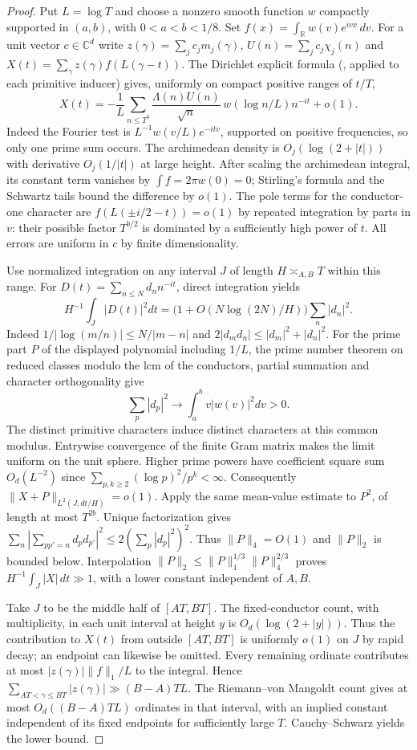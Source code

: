 \documentclass[11pt]{article}
\begin{document}
\begin{proof}
Put $L=\log T$ and choose a nonzero smooth function $w$ compactly supported
in $(a,b)$, with $0<a<b<1/8$. Set
$f(x)=\int_{\mathbb R}w(v)e^{ivx}\,dv$. For a unit vector $c\in\mathbb C^d$
write $z(\gamma)=\sum_j c_jm_j(\gamma)$, $U(n)=\sum_jc_j\chi_j(n)$ and
$X(t)=\sum_\gamma z(\gamma)f(L(\gamma-t))$.
The Dirichlet explicit formula
(\cite[Lemma 2.1]{liuye}, applied to each primitive inducer) gives, uniformly
on compact positive ranges of $t/T$,
\[
 X(t)=-\frac1L\sum_{n\le T^b}\frac{\Lambda(n)U(n)}{\sqrt n}\,
             w(\log n/L)n^{-it}+o(1).
\]
Indeed the Fourier test is $L^{-1}w(v/L)e^{-itv}$, supported on positive
frequencies, so only one prime sum occurs. The archimedean density is
$O_j(\log(2+|t|))$ with derivative $O_j(1/|t|)$ at large height.
After scaling the archimedean integral, its constant term vanishes by
$\int f=2\pi w(0)=0$; Stirling's formula and the Schwartz tails bound
the difference by $o(1)$. The pole terms for the conductor-one character
are $f(L(\pm i/2-t))=o(1)$ by repeated integration by parts in $v$:
their possible factor $T^{b/2}$ is dominated by a sufficiently high
power of $t$. All errors are uniform in $c$ by finite dimensionality.

Use normalized integration on any interval $J$ of length $H\asymp_{A,B}T$
within this range. For $D(t)=\sum_{n\le N}d_n n^{-it}$, direct integration yields
\[
 H^{-1}\int_J|D(t)|^2dt=
 \bigl(1+O(N\log(2N)/H)\bigr)\sum_n|d_n|^2 .
\]
Indeed $1/|\log(m/n)|\le N/|m-n|$ and
$2|d_m d_n|\le |d_m|^2+|d_n|^2$.
For the prime part $P$ of the displayed polynomial including $1/L$,
the prime number theorem on reduced classes modulo the lcm of the
conductors, partial summation and character orthogonality give
\[
 \sum_p |d_p|^2\longrightarrow
       \int_a^b v|w(v)|^2dv>0 .
\]
The distinct primitive characters induce distinct characters at this common
modulus. Entrywise convergence of the finite Gram matrix makes the limit
uniform on the unit sphere. Higher prime powers have coefficient square sum
$O_d(L^{-2})$ since $\sum_{p,k\ge2}(\log p)^2/p^k<\infty$.
Consequently $\|X+P\|_{L^2(J,dt/H)}=o(1)$.
Apply the same mean-value estimate to $P^2$, of length at most $T^{2b}$.
Unique factorization gives
$\sum_n|\sum_{p p'=n} d_pd_{p'}|^2\le2(\sum_p|d_p|^2)^2$.
Thus $\|P\|_4=O(1)$ and $\|P\|_2$ is bounded below.
Interpolation $\|P\|_2\le\|P\|_1^{1/3}\|P\|_4^{2/3}$ proves
$H^{-1}\int_J|X|\,dt\gg 1$, with a lower constant independent of $A,B$.

Take $J$ to be the middle half of $[AT,BT]$. The fixed-conductor count,
with multiplicity, in each unit interval at height $y$ is
$O_d(\log(2+|y|))$. Thus the contribution to $X(t)$ from outside
$[AT,BT]$ is uniformly $o(1)$ on $J$ by rapid decay; an endpoint
can likewise be omitted. Every remaining ordinate contributes at most
$|z(\gamma)|\|f\|_1/L$ to the integral. Hence
$\sum_{AT<\gamma\le BT}|z(\gamma)|\gg (B-A)TL$.
The Riemann--von Mangoldt count gives at most $O_d((B-A)TL)$ ordinates
in that interval, with an implied constant independent of its fixed
endpoints for sufficiently large $T$. Cauchy--Schwarz yields the lower bound.


\end{proof}
\end{document}
